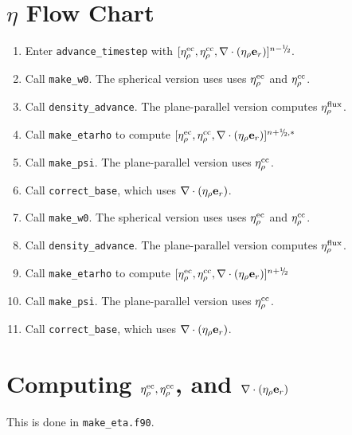 \section{$\eta$ Flow Chart}
\begin{enumerate}
\item Enter {\tt advance\_timestep} with $[\etarhoec, \etarhocc, \divetarho]^{n-\myhalf}$.
\item Call {\tt make\_w0}.  The spherical version uses uses $\eta_{\rho}^{\rm ec}$ and $\eta_{\rho}^{\rm cc}$.
\item Call {\tt density\_advance}.  The plane-parallel version computes $\eta_{\rho}^{\rm flux}$.
\item Call {\tt make\_etarho} to compute $[\etarhoec, \etarhocc, \divetarho]^{n+\myhalf,*}$
\item Call {\tt make\_psi}.  The plane-parallel version uses $\eta_{\rho}^{\rm cc}$.
\item Call {\tt correct\_base}, which uses $\nabla\cdot(\eta_{\rho}{\bf e}_r)$.
\item Call {\tt make\_w0}.  The spherical version uses uses $\eta_{\rho}^{\rm ec}$ and $\eta_{\rho}^{\rm cc}$.
\item Call {\tt density\_advance}.  The plane-parallel version computes $\eta_{\rho}^{\rm flux}$.
\item Call {\tt make\_etarho} to compute $[\etarhoec, \etarhocc, \divetarho]^{n+\myhalf}$
\item Call {\tt make\_psi}.  The plane-parallel version uses $\eta_{\rho}^{\rm cc}$.
\item Call {\tt correct\_base}, which uses $\nabla\cdot(\eta_{\rho}{\bf e}_r)$.
\end{enumerate}

\section{Computing $\eta_{\rho}^{\rm ec}, \eta_{\rho}^{\rm cc}$, and $\nabla\cdot(\eta_{\rho}{\bf e}_r)$}
This is done in {\tt make\_eta.f90}.

